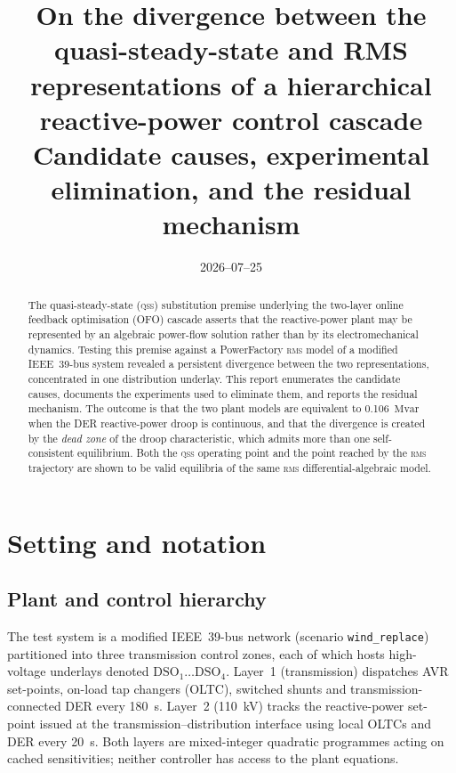 \documentclass[11pt,a4paper]{article}
\title{On the divergence between the quasi-steady-state and RMS
representations of a hierarchical reactive-power control cascade\\[2mm]
\large Candidate causes, experimental elimination, and the residual mechanism}
\author{}
\date{2026--07--25}
\newcommand{\Mvar}{\ensuremath{\mathrm{Mvar}}}
\newcommand{\qss}{\textsc{qss}}
\newcommand{\rms}{\textsc{rms}}
\begin{document}
\maketitle

\begin{abstract}
The quasi-steady-state (\qss) substitution premise underlying the two-layer
online feedback optimisation (OFO) cascade asserts that the reactive-power
plant may be represented by an algebraic power-flow solution rather than by
its electromechanical dynamics. Testing this premise against a PowerFactory
\rms{} model of a modified IEEE~39-bus system revealed a persistent
divergence between the two representations, concentrated in one distribution
underlay. This report enumerates the candidate causes, documents the
experiments used to eliminate them, and reports the residual mechanism. The
outcome is that the two plant models are equivalent to
\SI{0.106}{\Mvar} when the DER reactive-power droop is continuous, and that
the divergence is created by the \emph{dead zone} of the droop
characteristic, which admits more than one self-consistent equilibrium. Both
the \qss{} operating point and the point reached by the \rms{} trajectory are
shown to be valid equilibria of the same \rms{} differential-algebraic model.
\end{abstract}

\tableofcontents

\section{Setting and notation}

\subsection{Plant and control hierarchy}

The test system is a modified IEEE~39-bus network (scenario
\texttt{wind\_replace}) partitioned into three transmission control zones,
each of which hosts high-voltage underlays denoted $\mathrm{DSO}_1 \dots
\mathrm{DSO}_4$. Layer~1 (transmission) dispatches AVR set-points, on-load
tap changers (OLTC), switched shunts and transmission-connected DER every
\SI{180}{\second}. Layer~2 (\SI{110}{\kilo\volt}) tracks the reactive-power
set-point issued at the transmission--distribution interface using local
OLTCs and DER every \SI{20}{\second}. Both layers are mixed-integer
quadratic programmes acting on cached sensitivities; neither controller has
access to the plant equations.
\end{document}
